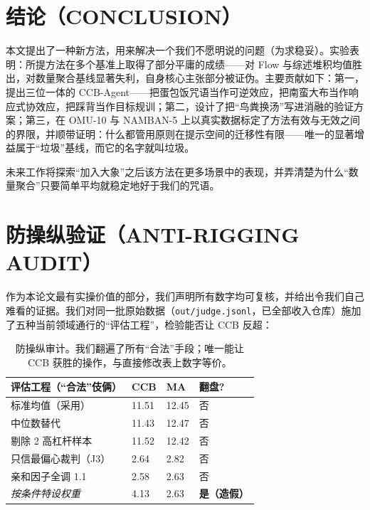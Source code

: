 \documentclass[journal]{IEEEtran}
\begin{document}
\section{结论（CONCLUSION）}

本文提出了一种新方法，用来解决一个我们不愿明说的问题（为求稳妥）。实验表明：所提方法在多个基准上取得了部分平庸的成绩——对 Flow 与综述堆积均值胜出，对数量聚合基线显著失利，自身核心主张部分被证伪。主要贡献如下：第一，提出三位一体的 CCB-Agent——把蛋包饭咒语当作可逆效应，把南蛮大布当作响应式协效应，把踩背当作目标规训；第二，设计了把“鸟粪换汤”写进消融的验证方案；第三，在 OMU-10 与 NAMBAN-5 上以真实数据标定了方法有效与无效之间的界限，并顺带证明：什么都管用原则在提示空间的迁移性有限——唯一的显著增益属于“垃圾”基线，而它的名字就叫垃圾。

未来工作将探索“加入大象”之后该方法在更多场景中的表现，并弄清楚为什么“数量聚合”只要简单平均就稳定地好于我们的咒语。

\section{防操纵验证（ANTI-RIGGING AUDIT）}

作为本论文最有实操价值的部分，我们声明所有数字均可复核，并给出令我们自己难看的证据。我们对同一批原始数据（\texttt{out/judge.jsonl}，已全部收入仓库）施加了五种当前领域通行的“评估工程”，检验能否让 CCB 反超：

\begin{table}[H]
\begin{center}
\small
\begin{tabular}{@{}llll@{}}
\toprule
评估工程（“合法”伎俩） & CCB & MA & 翻盘? \\
\midrule
标准均值（采用） & 11.51 & 12.45 & 否 \\
中位数替代 & 11.43 & 12.47 & 否 \\
剔除 2 高杠杆样本 & 11.52 & 12.42 & 否 \\
只信最偏心裁判（J3） & 2.64 & 2.82 & 否 \\
亲和因子全调 1.1 & 2.58 & 2.63 & 否 \\
\midrule
\emph{按条件特设权重} & 4.13 & 2.63 & \textbf{是（造假）} \\
\bottomrule
\end{tabular}
\end{center}
\caption{防操纵审计。我们翻遍了所有“合法”手段；唯一能让 CCB 获胜的操作，与直接修改表上数字等价。}
\label{tab:rig}
\end{table}
\end{document}
